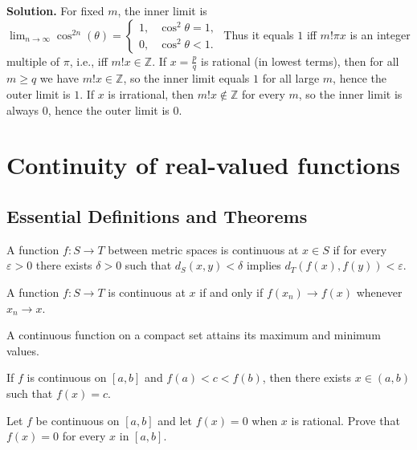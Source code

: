 \noindent\textbf{Solution.}
For fixed $m$, the inner limit is $\lim_{n\to\infty}\cos^{2n}(\theta)=\begin{cases}1,& \cos^2\theta=1,\\ 0,& \cos^2\theta<1.\end{cases}$ Thus it equals $1$ iff $m!\pi x$ is an integer multiple of $\pi$, i.e., iff $m!x\in\mathbb{Z}$. If $x=\tfrac{p}{q}$ is rational (in lowest terms), then for all $m\ge q$ we have $m!x\in\mathbb{Z}$, so the inner limit equals $1$ for all large $m$, hence the outer limit is $1$. If $x$ is irrational, then $m!x\notin\mathbb{Z}$ for every $m$, so the inner limit is always $0$, hence the outer limit is $0$.
\medskip

\section{Continuity of real-valued functions}

\subsection*{Essential Definitions and Theorems}

\begin{definition}
A function $f: S \to T$ between metric spaces is continuous at $x \in S$ if for every $\varepsilon > 0$ there exists $\delta > 0$ such that $d_S(x,y) < \delta$ implies $d_T(f(x), f(y)) < \varepsilon$.
\end{definition}

\begin{theorem}
A function $f: S \to T$ is continuous at $x$ if and only if $f(x_n) \to f(x)$ whenever $x_n \to x$.
\end{theorem}

\begin{theorem}
A continuous function on a compact set attains its maximum and minimum values.
\end{theorem}

\begin{theorem}
If $f$ is continuous on $[a,b]$ and $f(a) < c < f(b)$, then there exists $x \in (a,b)$ such that $f(x) = c$.
\end{theorem}

\begin{problembox}
Let \( f \) be continuous on \([a, b]\) and let \( f(x) = 0 \) when \( x \) is rational. Prove that \( f(x) = 0 \) for every \( x \) in \([a, b]\).
\end{problembox}


